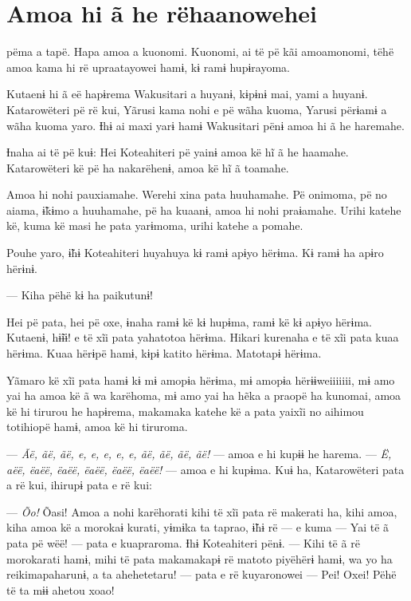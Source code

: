 \chapter[Amoa hi ã he rë haanowehei]{Amoa hi ã he rë\break haanowehei}

 pëma a tapë. Hapa amoa a kuonomi. Kuonomi, ai të pë kãi amoamonomi,
tëhë amoa kama hi rë upraatayowei hamɨ, kɨ ramɨ hupɨrayoma. 

Kutaenɨ hi ã eë hapɨrema Wakusitari a huyanɨ, kɨpɨnɨ mai, yami a huyanɨ.
Katarowëteri pë rë kui, Yãrusi kama nohi e pë wãha kuoma, Yarusi përɨamɨ
a wãha kuoma yaro. Ɨhɨ ai maxi yarɨ hamɨ Wakusitari pënɨ amoa hi ã he
haremahe.

Ɨnaha ai të pë kuɨ: Hei Koteahiteri pë yainɨ amoa kë hĩ ã he haamahe.
Katarowëteri kë pë ha nakarëhenɨ, amoa kë hĩ ã toamahe. 

Amoa hi nohi pauxiamahe. Werehi xina pata huuhamahe. Pë onimoma, pë no
aiama, ɨ̃kɨmo a huuhamahe, pë ha kuaanɨ, amoa hi nohi praɨamahe. Urihi
katehe kë, kuma kë masi he pata yarɨmoma, urihi katehe a pomahe. 

Pouhe yaro, ɨ̃hɨ Koteahiteri huyahuya kɨ ramɨ apɨyo hërɨma. Kɨ ramɨ ha
apɨro hërɨnɨ. 

--- Kiha pëhë kɨ ha paikutunɨ! 

Hei pë pata, hei pë oxe, ɨnaha ramɨ kë kɨ hupɨma, ramɨ kë kɨ apɨyo
hërɨma. Kutaenɨ, hɨ̃ɨɨ! e të xĩi pata yahatotoa hërɨma. Hikari kurenaha e
të xĩi pata kuaa hërɨma. Kuaa hërɨpë hamɨ, kɨpɨ katito hërɨma. Matotapɨ
hërɨma. 

Yãmaro kë xĩi pata hamɨ kɨ mɨ amopɨa hërɨma, mɨ amopɨa hërɨɨweiiiiiii,
mɨ amo yai ha amoa kë ã wa karëhoma, mɨ amo yai ha hẽka a praopë ha
kunomai, amoa kë hi tirurou he hapɨrema, makamaka katehe kë a pata
yaixĩi no aihimou totihiopë hamɨ, amoa kë hi tiruroma. 

--- \textit{Ãë, ãë, ãë, e, e, e, e, e, ãë, ãë, ãë, ãë!} --- amoa e hi kupɨɨ he
harema. --- \textit{Ë, aëë, ëaëë, ëaëë, ëaëë, ëaëë, ëaëë!} --- amoa e hi kupɨma.
Kuɨ ha, Katarowëteri pata a rë kui, ihirupɨ pata e rë kui: 

--- \textit{Õo!} Õasi! Amoa a nohi karëhorati kihi të xĩi pata rë makerati ha,
kihi amoa, kiha amoa kë a morokaɨ kurati, yɨmɨka ta taprao, ɨ̃hɨ rë --- e
kuma --- Yai të ã pata pë wëë! --- pata e kuapraroma. Ɨhɨ Koteahiteri
pënɨ. --- Kihi të ã rë morokarati hamɨ, mihi të pata makamakapɨ rë
matoto piyëhërɨ hamɨ, wa yo ha reikimapaharunɨ, a ta ahehetetaru! ---
pata e rë kuyaronowei --- Pei! Oxei! Pëhë të ta mɨɨ ahetou xoao! 

